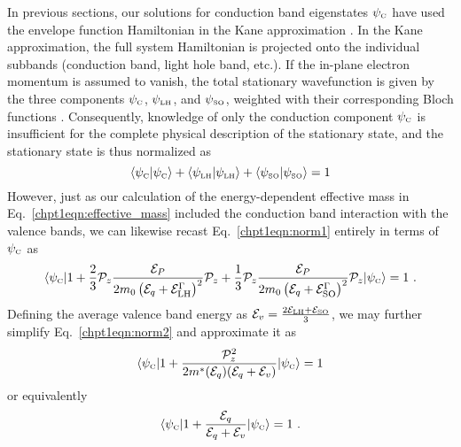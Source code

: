 {In previous sections, our solutions for conduction band eigenstates $\psi_{\textnormal{\tiny{C}}}$ have used the envelope function Hamiltonian in the Kane approximation \cite{Bastard:book:1991}.  In the Kane approximation, the full system Hamiltonian is projected onto the individual subbands (conduction band, light hole band, etc.).  If the in-plane electron momentum is assumed to vanish, the total stationary wavefunction is given by the three components $\psi_{\textnormal{\tiny{C}}}$, $\psi_{\textnormal{\tiny{LH}}}$, and $\psi_{\textnormal{\tiny{SO}}}$, weighted with their corresponding Bloch functions \cite{Sirtori:PRB:1994}.  Consequently, knowledge of only the conduction component $\psi_{\textnormal{\tiny{C}}}$ is insufficient for the complete physical description of the stationary state, and the stationary state is thus normalized as \cite{Sirtori:PRB:1994}
\begin{equation}
\label{chpt1eqn:norm1}
\langle \psi_{\textnormal{\tiny{C}}} | \psi_{\textnormal{\tiny{C}}} \rangle + \langle \psi_{\textnormal{\tiny{LH}}} | \psi_{\textnormal{\tiny{LH}}} \rangle + \langle \psi_{\textnormal{\tiny{SO}}} | \psi_{\textnormal{\tiny{SO}}} \rangle = 1
\end{equation}
However, just as our calculation of the energy-dependent effective mass in Eq.~\eqref{chpt1eqn:effective_mass} included the conduction band interaction with the valence bands, we can likewise recast Eq.~\eqref{chpt1eqn:norm1} entirely in terms of $\psi_{\textnormal{\tiny{C}}}$ as \cite{Sirtori:PRB:1994}
\begin{equation}
\label{chpt1eqn:norm2}
\langle \psi_\tn{\tiny{C}} | 1+\frac{2}{3}\mathcal{P}_z \frac{\EE_P}{2 m_0 \left(\EE_q+\EE_{\tn{LH}}^\Gamma\right)^2} \mathcal{P}_z +  \frac{1}{3}\mathcal{P}_z \frac{\EE_P}{2 m_0 \left(\EE_q+\EE_{\tn{SO}}^\Gamma\right)^2} \mathcal{P}_z| \psi_\tn{\tiny{C}} \rangle= 1 \tn{~.}
\end{equation}
Defining the average valence band energy as
$\EE_v = \frac{2 \EE_\tn{LH} + \EE_\tn{SO}}{3}$, we may further simplify Eq.~\eqref{chpt1eqn:norm2} and approximate it as \cite{Leavitt:PRB:1991}
\begin{equation}
\langle \psi_\tn{\tiny{C}} |1 + \frac{\mathcal{P}_z^2}{2 m^*(\EE_q) (\EE_q+\EE_v)} | \psi_\tn{\tiny{C}} \rangle = 1
\end{equation}
or equivalently
\begin{equation}
\langle \psi_\tn{\tiny{C}} |1 +  \frac{\EE_q}{\EE_q+\EE_v} | \psi_\tn{\tiny{C}} \rangle = 1 \tn{~.}
\end{equation}




}
